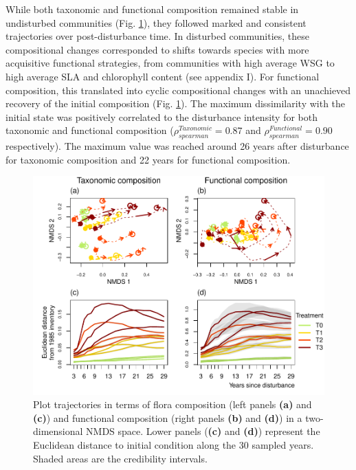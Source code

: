 \documentclass[
  11pt,
  french,
  A4paper,
  extrafontsizes,onecolumn,openright
  ]{memoir}
\begin{document}
While both taxonomic and functional composition remained stable in
undisturbed communities (Fig. \ref{fig:NMDSplans}), they followed marked
and consistent trajectories over post-\break disturbance time. In
disturbed communities, these compositional changes corresponded to
shifts towards species with more acquisitive functional strategies, from
communities with high average WSG to high average SLA and chlorophyll
content (see appendix I). For functional composition, this translated
into cyclic compositional changes with an unachieved recovery of the
initial composition (Fig. \ref{fig:NMDSplans}). The maximum
dissimilarity with the initial state was positively correlated to the
disturbance intensity for both taxonomic and functional composition
(\(\rho_{spearman}^{Taxonomic}=0.87\) and
\(\rho_{spearman}^{Functional}=0.90\) respectively). The maximum value
was reached around 26 years after disturbance for taxonomic composition
and 22 years for functional composition.

\begin{figure}

{\centering \includegraphics[width=1\linewidth]{Manuscript_files/figure-latex/NMDSplans-1} 

}

\caption{Plot trajectories in terms of flora composition (left panels \textbf{(a)} and \textbf{(c)}) and functional composition (right panels \textbf{(b)} and \textbf{(d)}) in a two-dimensional NMDS space. Lower panels (\textbf{(c)} and \textbf{(d)}) represent the Euclidean distance to initial condition along the 30 sampled years. Shaded areas are the credibility intervals.}\label{fig:NMDSplans}
\end{figure}
\end{document}
